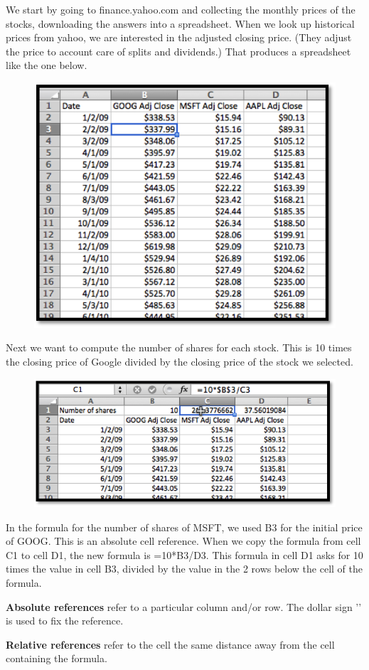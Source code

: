 \documentclass[10pt,]{book}
\newcommand{\terminology}[1]{\textbf{#1}}
\theoremstyle{plain}
\theoremstyle{definition}
\newenvironment{assemblage-untitled}{\mdfsetup{%
roundcorner=2ex, backgroundcolor=blue!5,linecolor=blue!75!black,}%
\begin{mdframed}}{\end{mdframed}}
\theoremstyle{definition}
\begin{document}
We start by going to finance.yahoo.com and collecting the monthly prices of the stocks, downloading the answers into a spreadsheet.  When we look up historical prices from yahoo, we are interested in the adjusted closing price.  (They adjust the price to account care of splits and dividends.)  That produces a spreadsheet like the one below.
%
\leavevmode%
\begin{figure}
\centering
\includegraphics[width=0.8\linewidth]{images/sec1-3-9SharePrices.png}
\end{figure}
\par

Next we want to compute the number of shares for each stock.  This is 10 times the closing price of Google divided by the closing price of the stock we selected.
%
\leavevmode%
\begin{figure}
\centering
\includegraphics[width=0.8\linewidth]{images/sec1-3-10ShareAjustments.png}
\end{figure}
\par
In the formula for the number of shares of MSFT, we used \textdollar{}B\textdollar{}3 for the initial price of GOOG.  This is an absolute cell reference.  When we copy the formula from cell C1 to cell D1, the new formula is =10*\textdollar{}B\textdollar{}3/D3.  This formula in cell D1 asks for 10 times the value in cell B3, divided by the value in the 2 rows below the cell of the formula.  %
\begin{assemblage-untitled}\label{assemblage-8}
\terminology{Absolute references} refer to a particular column and/or row.  The dollar sign '\textdollar{}' is used to fix the reference.%
\par

\terminology{Relative references} refer to the cell the same distance away from the cell containing the formula.%
\end{assemblage-untitled}
\par
\end{document}
